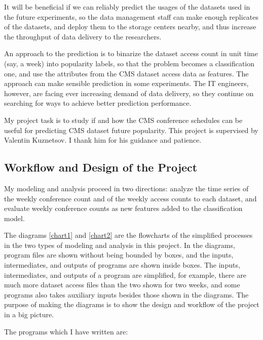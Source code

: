 \documentclass[final, 12pt]{elsarticle}
\begin{document}
It will be beneficial if we can reliably predict the usages of the datasets used in the future experiments, so the data management staff can make enough replicates of the datasets, and deploy them to the storage centers nearby, and thus increase the throughput of data delivery to the researchers. 

An approach to the prediction is to binarize the dataset access count in unit time (say, a week) into popularity labels, so that the problem becomes a classification one, and use the attributes from the CMS dataset access data as features. \cite{web:vk}
The approach can make sensible prediction in some experiments.
The IT engineers, however, are facing ever increasing demand of data delivery, so they continue on searching for ways to achieve better prediction performance.

My project task is to study if and how the CMS conference schedules can be useful for predicting CMS dataset future popularity.
This project is supervised by Valentin Kuznetsov. I thank him for his guidance and patience.


\subsection{Workflow and Design of the Project}

My modeling and analysis proceed in two directions: analyze the time series of the weekly conference count and of the weekly access counts to each dataset,  and evaluate weekly conference counts as new features added to the classification model.

The diagrams \ref{chart1} and \ref{chart2} are the flowcharts of the simplified processes in the two types of modeling and analysis in this project.
In the diagrams, program files are shown without being bounded by boxes, and the inputs, intermediates, and outputs of programs are shown inside boxes.
The inputs, intermediates, and outputs of a program are simplified, for example, there are much more dataset access files than the two shown for two weeks, and some programs also takes auxiliary inputs besides those shown in the diagrams.
The purpose of making the diagrams is to show the design and workflow of the project in a big picture.




The programs which I have written are:
\end{document}
